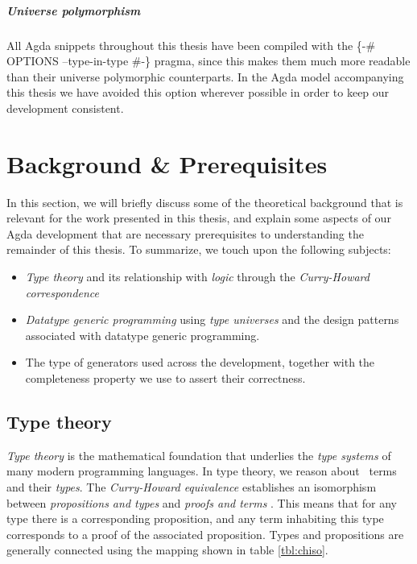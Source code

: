 \documentclass[a4paper,msc,twosized=semi]{uustthesis}
\let\oldemph\emph
\renewcommand\emph[1]{{\large\oldemph{#1}}}
\newcommand{\agda}[1]{{\agdafontinline\color{agdacolor}#1}}
\begin{document}
\vspace{-0.25cm}

  \paragraph{Universe polymorphism} All Agda snippets throughout this thesis have been 
  compiled with the \agda{\{-\# OPTIONS --type-in-type \#-\}} pragma, since this makes them 
  much more readable than their universe polymorphic counterparts. In the Agda model 
  accompanying this thesis we have avoided this option wherever possible in order to 
  keep our development consistent. 

\chapter{Background \& Prerequisites}
In this section, we will briefly discuss some of the theoretical background that is relevant for the work presented in this thesis, and explain some aspects of our Agda development that are necessary prerequisites to understanding the remainder of this thesis. To summarize, we touch upon the following subjects:

\begin{itemize}
  \item
    \emph{Type theory} and its relationship with \emph{logic} through the 
    \emph{Curry-Howard correspondence}

  \item 
    \emph{Datatype generic programming} using \emph{type universes} and the design 
    patterns associated with datatype generic programming.  

  \item 
    The type of generators used across the development, together with the completeness property we use to 
    assert their correctness. 

\end{itemize}

\section{Type theory}

  \emph{Type theory} is the mathematical foundation that underlies the \emph{type 
  systems} of many modern programming languages. In type theory, we reason about \emph\
  {terms} and their \emph{types}. The \emph{Curry-Howard equivalence} establishes an isomorphism between \emph
  {propositions and types} and \emph{proofs and terms} \cite{wadler2015propositions}. 
  This means that for any type there is a corresponding proposition, and any term 
  inhabiting this type corresponds to a proof of the associated proposition. Types and 
  propositions are generally connected using the mapping shown in table \ref{tbl:chiso}.
\end{document}
